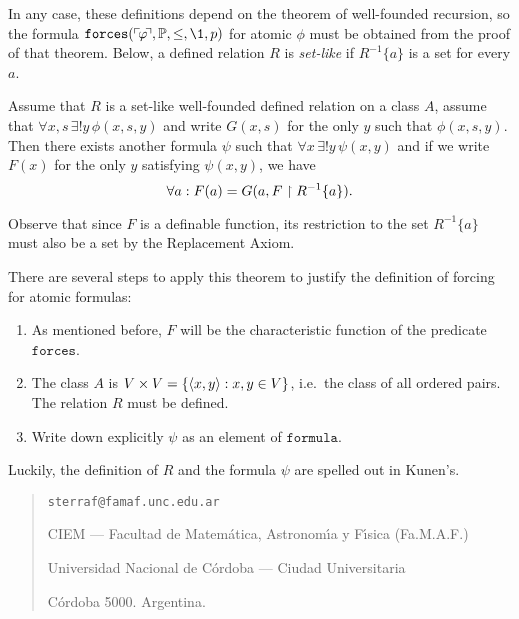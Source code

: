 \documentclass[11pt,english]{article}
\renewcommand{\PP}{\mathbb{P}}
\newcommand{\formula}{\ensuremath{\mathtt{formula}}}
\newcommand{\forceisa}{\mathtt{forces}}
\begin{document}
In any case, these definitions depend on the theorem of well-founded
recursion,
so the formula $\forceisa(\quine\phi,\PP,\leq,\1,p)$ for atomic $\phi$
must be obtained from the proof of that theorem. Below, a defined
relation $R$ is \emph{set-like} if $R^{-1}\{a\}$ is a set for every $a$.
%
\begin{theorem}
  Assume that $R$ is a
  set-like well-founded defined relation on a class $A$, assume that 
  $\forall  x,s\,\exists!y\,\phi(x,s,y)$ and write $G(x,s)$ for the
  only $y$ such that $\phi(x,s,y)$. Then there exists another formula 
   $\psi$ such that $\forall x\,\exists!y\,\psi(x,y)$ and if we write
  $F(x)$ for the only $y$ satisfying $\psi(x,y)$, we have
  \[
  \forall a: F(a) = G(a,F\upharpoonright R^{-1}\{a\}).
  \]
\end{theorem}
%
Observe that since $F$ is a definable function, its restriction to the
set $R^{-1}\{a\}$ must also be a set by the Replacement Axiom.

There are several steps to apply this theorem to justify the
definition of forcing for atomic formulas:
\begin{enumerate}
\item As mentioned before, $F$ will be the characteristic function of
  the predicate $\forceisa$.
\item The class $A$ is $V\times V = \{\langle x,y\rangle : x,y\in V\}$,
  i.e.\ the class of all ordered pairs. The relation $R$ must be
  defined.
\item Write down explicitly $\psi$ as an element of
  $\formula$. 
\end{enumerate}
%
Luckily, the definition of $R$ and the formula $\psi$ are spelled out
in Kunen's.






\bigskip

\begin{small}
  \begin{quote}
    \texttt{sterraf@famaf.unc.edu.ar}
    
    CIEM --- Facultad de Matem\'atica, Astronom\'{\i}a y F\'{\i}sica 
    (Fa.M.A.F.) 
    
    Universidad Nacional de C\'ordoba --- Ciudad Universitaria
    
    C\'ordoba 5000. Argentina.
  \end{quote}
\end{small}
\end{document}
